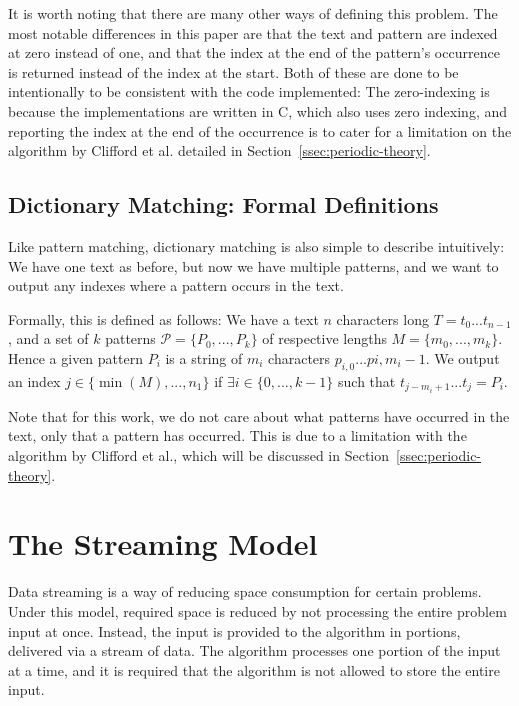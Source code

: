 \documentclass[ %
                    author={Dominic Joseph Moylett},
                    degree={MEng},
                     title={Dictionary Matching with Fingerprints},
                  subtitle={An Empirical Analysis},
                      type={Research},
                      year={2014} ]{dissertation}
\begin{document}
It is worth noting that there are many other ways of defining this problem. The most notable differences in this paper are that the text and pattern are indexed at zero instead of one, and that the index at the end of the pattern's occurrence is returned instead of the index at the start. Both of these are done to be intentionally to be consistent with the code implemented: The zero-indexing is because the implementations are written in C, which also uses zero indexing, and reporting the index at the end of the occurrence is to cater for a limitation on the algorithm by Clifford et al. detailed in Section~\ref{ssec:periodic-theory}.

\subsection{Dictionary Matching: Formal Definitions}
\label{ssec:dict-matching:definitions}

Like pattern matching, dictionary matching is also simple to describe intuitively: We have one text as before, but now we have multiple patterns, and we want to output any indexes where a pattern occurs in the text.

Formally, this is defined as follows: We have a text $n$ characters long $T = t_0...t_{n-1}$, and a set of $k$ patterns $\mathcal{P} = \{P_0,...,P_k\}$ of respective lengths $M = \{m_0,...,m_k\}$. Hence a given pattern $P_i$ is a string of $m_i$ characters $p_{i,0}...p{i,m_i-1}$. We output an index $j \in \{\min(M),...,n_1\}$ if $\exists i \in \{0,...,k-1\}$ such that $t_{j-m_i+1}...t_{j} = P_i$.

Note that for this work, we do not care about what patterns have occurred in the text, only that a pattern has occurred. This is due to a limitation with the algorithm by Clifford et al., which will be discussed in Section~\ref{ssec:periodic-theory}.

\section{The Streaming Model}

Data streaming is a way of reducing space consumption for certain problems. Under this model, required space is reduced by not processing the entire problem input at once. Instead, the input is provided to the algorithm in portions, delivered via a stream of data. The algorithm processes one portion of the input at a time, and it is required that the algorithm is not allowed to store the entire input.
\end{document}
